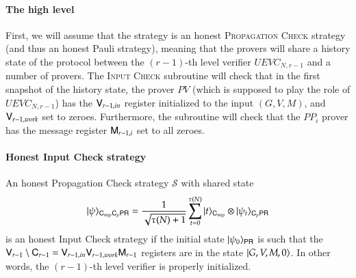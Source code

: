 \paragraph{The high level} First, we will assume that the strategy is an honest \textsc{Propagation Check} strategy (and thus an honest Pauli strategy), meaning that the provers will share a history state of the protocol between the $(r-1)$-th level verifier $UEVC_{N,r-1}$ and a number of provers. The \textsc{Input Check} subroutine will check that in the first snapshot of the history state, the prover $PV$ (which is supposed to play the role of $UEVC_{N,r-1}$) has the ${\mathsf{V}}_{r-1,in}$ register initialized to the input $(G,V,M)$, and ${\mathsf{V}}_{r-1,work} $ set to zeroes. Furthermore, the subroutine will check that the $PP_i$ prover has the message register ${\mathsf{M}}_{r-1,i}$ set to all zeroes.

\paragraph{Honest Input Check strategy}
An honest Propagation Check strategy $\mathcal{S}$ with shared state
\[
	|\psi\rangle_{{\mathsf{C}}_{mip} {\mathsf{C}}_p {\mathsf{P}} {\mathsf{R}}} = \frac{1}{\sqrt{\tau(N) + 1}} \sum_{t = 0}^{\tau(N)} |t\rangle_{{\mathsf{C}}_{mip}} \otimes |\psi_t\rangle_{{\mathsf{C}}_p {\mathsf{P}} {\mathsf{R}}}
\]
is an honest Input Check strategy if the initial state $|\psi_0\rangle_{{\mathsf{P}} {\mathsf{R}}}$ is such that the ${\mathsf{V}}_{r-1} \setminus {\mathsf{C}}_{r-1} = {\mathsf{V}}_{r-1,in}{\mathsf{V}}_{r-1,work} {\mathsf{M}}_{r-1}$ registers are in the state $|G,V,M,0\rangle$. In other words, the $(r-1)$-th level verifier is properly initialized.




